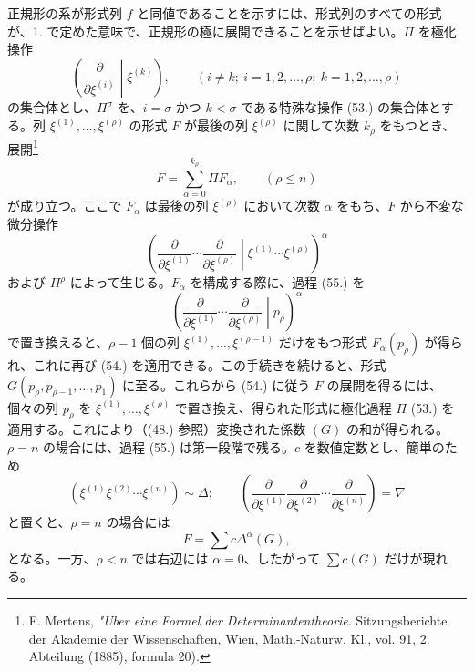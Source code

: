 \documentclass[11pt]{article}
\begin{document}
正規形の系が形式列 $f$ と同値であることを示すには、形式列のすべての形式が、1. で定めた意味で、正規形の極に展開できることを示せばよい。$\Pi$ を極化操作
\begin{equation}
 \left(\frac{\partial}{\partial\xi^{(i)}}\middle|\xi^{(k)}\right),
 \qquad (i\ne k;\ i=1,2,\ldots,\rho;\ k=1,2,\ldots,\rho)
\tag{53}
\end{equation}
の集合体とし、$\Pi^\sigma$ を、$i=\sigma$ かつ $k<\sigma$ である特殊な操作 (53.) の集合体とする。列 $\xi^{(1)},\ldots,\xi^{(\rho)}$ の形式 $F$ が最後の列 $\xi^{(\rho)}$ に関して次数 $k_\rho$ をもつとき、展開\footnote{F. Mertens, \emph{"Uber eine Formel der Determinantentheorie}. Sitzungsberichte der Akademie der Wissenschaften, Wien, Math.-Naturw. Kl., vol. 91, 2. Abteilung (1885), formula 20).}
\begin{equation}
 F=\sum_{\alpha=0}^{k_\rho}\Pi F_\alpha,
 \qquad(\rho\le n)
\tag{54}
\end{equation}
が成り立つ。ここで $F_\alpha$ は最後の列 $\xi^{(\rho)}$ において次数 $\alpha$ をもち、$F$ から不変な微分操作
\begin{equation}
 \left(\frac{\partial}{\partial\xi^{(1)}}\cdots\frac{\partial}{\partial\xi^{(\rho)}}\middle|\xi^{(1)}\cdots\xi^{(\rho)}\right)^\alpha
\tag{55}
\end{equation}
および $\Pi^\rho$ によって生じる。$F_\alpha$ を構成する際に、過程 (55.) を
\begin{equation}
 \left(\frac{\partial}{\partial\xi^{(1)}}\cdots\frac{\partial}{\partial\xi^{(\rho)}}\middle|p_\rho\right)^\alpha
\tag{56}
\end{equation}
で置き換えると、$\rho-1$ 個の列 $\xi^{(1)},\ldots,\xi^{(\rho-1)}$ だけをもつ形式 $F_\alpha(p_\rho)$ が得られ、これに再び (54.) を適用できる。この手続きを続けると、形式 $G(p_\rho,p_{\rho-1},\ldots,p_1)$ に至る。これらから (54.) に従う $F$ の展開を得るには、個々の列 $p_\rho$ を $\xi^{(1)},\ldots,\xi^{(\rho)}$ で置き換え、得られた形式に極化過程 $\Pi$ (53.) を適用する。これにより（(48.) 参照）変換された係数 $(G)$ の和が得られる。$\rho=n$ の場合には、過程 (55.) は第一段階で残る。$c$ を数値定数とし、簡単のため
\begin{equation}
 (\xi^{(1)}\xi^{(2)}\cdots\xi^{(n)})\sim\Delta;
 \qquad
 \left(\frac{\partial}{\partial\xi^{(1)}}\frac{\partial}{\partial\xi^{(2)}}\cdots\frac{\partial}{\partial\xi^{(n)}}\right)=\nabla
\tag{57}
\end{equation}
と置くと、$\rho=n$ の場合には
\begin{equation}
 F=\sum c\Delta^\alpha(G),
\tag{58}
\end{equation}
となる。一方、$\rho<n$ では右辺には $\alpha=0$、したがって $\sum c(G)$ だけが現れる。
\end{document}
